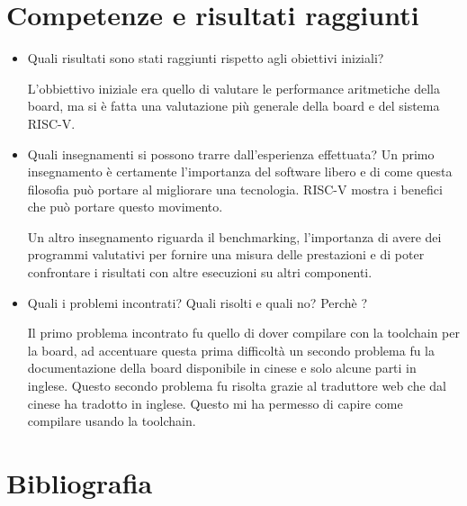 \documentclass[10pt]{article}
\begin{document}
\section{Competenze e risultati raggiunti }
\begin{itemize}
\item Quali risultati sono stati raggiunti rispetto agli obiettivi iniziali?

L'obbiettivo iniziale era quello di valutare le performance aritmetiche della board, ma si è fatta una valutazione più generale della board e del sistema RISC-V.

\item Quali insegnamenti si possono trarre dall’esperienza effettuata? 
Un primo insegnamento è certamente l'importanza del software libero e di come questa filosofia può portare al migliorare una tecnologia. RISC-V mostra i benefici che può portare questo movimento.
 
Un altro insegnamento riguarda il benchmarking, l'importanza di avere dei programmi valutativi per fornire una misura delle prestazioni e di poter confrontare i risultati con altre esecuzioni su altri componenti. 

\item Quali i problemi incontrati? Quali risolti e quali no? Perchè ? 

Il primo problema incontrato fu quello di dover compilare con la toolchain per la board, ad accentuare questa prima difficoltà un secondo problema fu la documentazione della board disponibile in cinese e solo alcune parti in inglese.  Questo secondo problema fu risolta grazie al traduttore web che dal cinese ha tradotto in inglese. Questo mi ha permesso di capire come compilare usando la toolchain.


\end{itemize}

\section{Bibliografia }
\printbibliography
\nocite{*}
\end{document}
